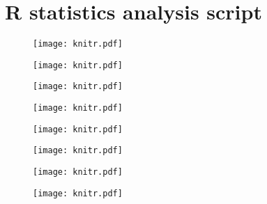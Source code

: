 
\chapter{R statistics analysis script}
\label{appendixi}

\begin{figure}[htbp]
\centerline{\texttt{[image: knitr.pdf]}}
\end{figure}

\newpage

\begin{figure}[htbp]
\centerline{\texttt{[image: knitr.pdf]}}
\end{figure}

\newpage

\begin{figure}[htbp]
\centerline{\texttt{[image: knitr.pdf]}}
\end{figure}

\newpage

\begin{figure}[htbp]
\centerline{\texttt{[image: knitr.pdf]}}
\end{figure}

\newpage

\begin{figure}[htbp]
\centerline{\texttt{[image: knitr.pdf]}}
\end{figure}

\newpage

\begin{figure}[htbp]
\centerline{\texttt{[image: knitr.pdf]}}
\end{figure}

\newpage

\begin{figure}[htbp]
\centerline{\texttt{[image: knitr.pdf]}}
\end{figure}

\newpage

\begin{figure}[htbp]
\centerline{\texttt{[image: knitr.pdf]}}
\end{figure}

